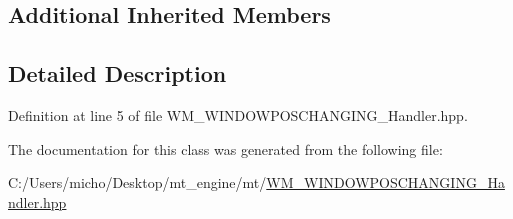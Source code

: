\subsection*{Additional Inherited Members}


\subsection{Detailed Description}


Definition at line 5 of file W\+M\+\_\+\+W\+I\+N\+D\+O\+W\+P\+O\+S\+C\+H\+A\+N\+G\+I\+N\+G\+\_\+\+Handler.\+hpp.



The documentation for this class was generated from the following file\+:\begin{DoxyCompactItemize}
\item 
C\+:/\+Users/micho/\+Desktop/mt\+\_\+engine/mt/\hyperlink{_w_m___w_i_n_d_o_w_p_o_s_c_h_a_n_g_i_n_g___handler_8hpp}{W\+M\+\_\+\+W\+I\+N\+D\+O\+W\+P\+O\+S\+C\+H\+A\+N\+G\+I\+N\+G\+\_\+\+Handler.\+hpp}\end{DoxyCompactItemize}

